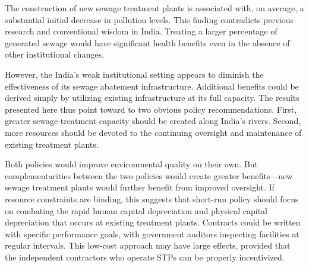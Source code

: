 \documentclass[12pt]{article}
\begin{document}
The construction of new sewage treatment plants is associated with, on average, a substantial initial decrease in pollution levels. This finding contradicts previous research \citep{greenstone2014} and conventional wisdom in India. Treating a larger percentage of generated sewage would have significant health benefits even in the absence of other institutional changes.

However, the India's weak institutional setting appears to diminish the effectiveness of its sewage abatement infrastructure. Additional benefits could be derived simply by utilizing existing infrastructure at its full capacity. The results presented here thus point toward to two obvious policy recommendations. First, greater sewage-treatment capacity should be created along India's rivers. Second, more resources should be devoted to the continuing oversight and maintenance of existing treatment plants.

Both policies would improve environmental quality on their own. But complementarities between the two policies would create greater benefits---new sewage treatment plants would further benefit from improved oversight. If resource constraints are binding, this suggests that short-run policy should focus on combating the rapid  human capital depreciation and physical capital depreciation that occurs at existing treatment plants. Contracts could be written with specific performance goals, with government auditors inspecting facilities at regular intervals. This low-cost approach may have large effects, provided that the independent contractors who operate STPs can be properly incentivized. 


\pagebreak



\end{document}

